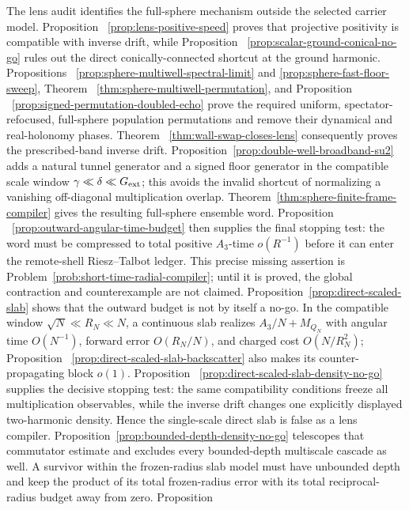 \documentclass[11pt]{article}
\theoremstyle{remark}
\begin{document}
 The lens audit identifies the full-sphere mechanism outside the selected
 carrier model.  Proposition
 ~\ref{prop:lens-positive-speed} proves that projective positivity is
 compatible with inverse drift, while Proposition
 ~\ref{prop:scalar-ground-conical-no-go} rules out the direct
 conically-connected shortcut at the ground harmonic.  Propositions
 ~\ref{prop:sphere-multiwell-spectral-limit} and
 \ref{prop:sphere-fast-floor-sweep}, Theorem
 ~\ref{thm:sphere-multiwell-permutation}, and Proposition
 ~\ref{prop:signed-permutation-doubled-echo} prove the required uniform,
 spectator-refocused, full-sphere population permutations and remove their
 dynamical and real-holonomy phases.  Theorem
 ~\ref{thm:wall-swap-closes-lens} consequently proves the prescribed-band
 inverse drift.  Proposition~\ref{prop:double-well-broadband-su2} adds a
 natural tunnel generator and a signed floor generator in the compatible
 scale window $\gamma\ll\delta\ll G_{\rm ext}$; this avoids the invalid
 shortcut of normalizing a vanishing off-diagonal multiplication overlap.
 Theorem~\ref{thm:sphere-finite-frame-compiler} gives the resulting
 full-sphere ensemble word.  Proposition
 ~\ref{prop:outward-angular-time-budget} then supplies the final stopping
 test: the word must be compressed to total positive $A_3$-time $o(R^{-1})$
 before it can enter the remote-shell Riesz--Talbot ledger.  This precise
 missing assertion is Problem~\ref{prob:short-time-radial-compiler}; until it
 is proved, the global contraction and counterexample are not claimed.
 Proposition~\ref{prop:direct-scaled-slab} shows that the outward budget is
 not by itself a no-go.  In the compatible window
 $\sqrt N\ll R_N\ll N$, a continuous slab realizes
 $A_3/N+M_{Q_N}$ with angular time $O(N^{-1})$, forward error
 $O(R_N/N)$, and charged cost $O(N/R_N^2)$; Proposition
 ~\ref{prop:direct-scaled-slab-backscatter} also makes its
 counter-propagating block $o(1)$.  Proposition
 ~\ref{prop:direct-scaled-slab-density-no-go} supplies the decisive stopping
 test: the same compatibility conditions freeze all multiplication
 observables, while the inverse drift changes one explicitly displayed
 two-harmonic density.  Hence the single-scale direct slab is false as a
 lens compiler.  Proposition~\ref{prop:bounded-depth-density-no-go}
 telescopes that commutator estimate and excludes every bounded-depth
 multiscale cascade as well.  A survivor within the frozen-radius slab model
 must have unbounded depth and keep the product of its total frozen-radius
 error with its total reciprocal-radius budget away from zero.  Proposition
\end{document}

